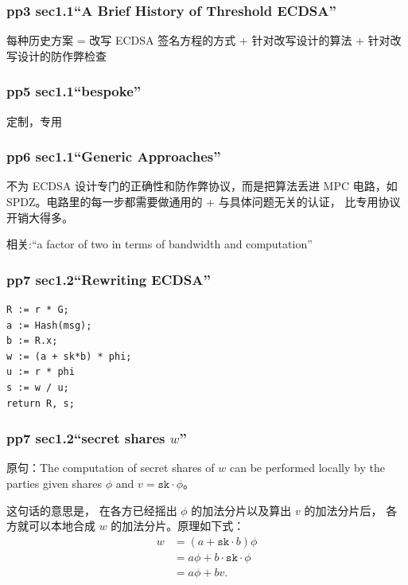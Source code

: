 

\subsubsection{pp3 sec1.1“A Brief History of Threshold ECDSA”}\label{pp3-sec1.1-a-brief-history-of-threshold-ecdsa}

每种历史方案 = 改写 ECDSA 签名方程的方式 + 针对改写设计的算法 +
针对改写设计的防作弊检查

\subsubsection{pp5 sec1.1“bespoke”}\label{pp5-sec1.1-bespoke}

定制，专用

\subsubsection{pp6 sec1.1“Generic Approaches”}\label{pp6-sec1.1-generic-approaches}

不为 ECDSA 设计专门的正确性和防作弊协议，而是把算法丢进 MPC 电路，如
SPDZ。电路里的每一步都需要做通用的 + 与具体问题无关的认证，
比专用协议开销大得多。

相关:“a factor of two in terms of bandwidth and computation”

\subsubsection{pp7 sec1.2“Rewriting ECDSA”}\label{pp7-sec1.2-rewriting-ecdsa}

\begin{verbatim}
R := r * G;
a := Hash(msg);
b := R.x;
w := (a + sk*b) * phi;
u := r * phi
s := w / u;
return R, s;
\end{verbatim}

\subsubsection{\texorpdfstring{pp7 sec1.2“secret shares $w$”}{pp7 sec1.2“secret sharesw”}}\label{pp7-sec1.2-secret-sharesw}

原句：The computation of secret shares of $w$ can be performed locally
by the parties given shares $\phi$ and $v = \mathtt{sk}\cdot\phi$。

这句话的意思是，
在各方已经摇出 $\phi$ 的加法分片以及算出 $v$ 的加法分片后，
各方就可以本地合成 $w$ 的加法分片。原理如下式：
\begin{equation}\label{eq:dkls23:1}
\begin{aligned}
w &= (a+\mathtt{sk}\cdot b)\phi \\
&= a\phi + b\cdot \mathtt{sk}\cdot \phi \\
&= a\phi + bv.
\end{aligned}
\end{equation}

